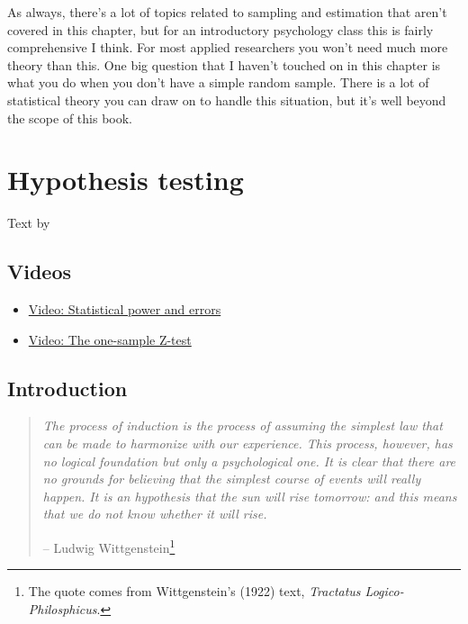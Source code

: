 \documentclass[
]{book}
\begin{document}
As always, there's a lot of topics related to sampling and estimation that aren't covered in this chapter, but for an introductory psychology class this is fairly comprehensive I think. For most applied researchers you won't need much more theory than this. One big question that I haven't touched on in this chapter is what you do when you don't have a simple random sample. There is a lot of statistical theory you can draw on to handle this situation, but it's well beyond the scope of this book.

\hypertarget{hypothesistesting}{%
\chapter{Hypothesis testing}\label{hypothesistesting}}

Text by \citet{Navarro2018}

\hypertarget{videos-3}{%
\section{Videos}\label{videos-3}}

\begin{itemize}
\item
  \href{https://youtu.be/-Cu0E2diTBE}{Video: Statistical power and errors}
\item
  \href{https://youtu.be/TE61rB6ajTY}{Video: The one-sample Z-test}
\end{itemize}

\hypertarget{introduction-3}{%
\section{Introduction}\label{introduction-3}}

\begin{quote}
\emph{The process of induction is the process of assuming the simplest law that can be made to harmonize with our experience. This process, however, has no logical foundation but only a psychological one. It is clear that there are no grounds for believing that the simplest course of events will really happen. It is an hypothesis that the sun will rise tomorrow: and this means that we do not know whether it will rise.}

-- Ludwig Wittgenstein\footnote{The quote comes from Wittgenstein's (1922) text, \emph{Tractatus Logico-Philosphicus}.}
\end{quote}
\end{document}
